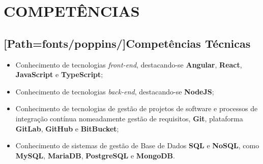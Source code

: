 \section*{\MakeUppercase{Competências}}
\vspace{-1em}
\subsection*{[Path=fonts/poppins/]Competências Técnicas}

\begin{itemize}
	\setlength\itemsep{2pt}
	\item Conhecimento de tecnologias \textit{front-end}, destacando-se \textbf{Angular}, \textbf{React}, \textbf{JavaScript} e \textbf{TypeScript};
	\item Conhecimento de tecnologias \textit{back-end}, destacando-se \textbf{NodeJS};
	\item Conhecimento de tecnologias de gestão de projetos de software e processos de integração contínua nomeadamente gestão de requisitos, \textbf{Git}, plataforma \textbf{GitLab}, \textbf{GitHub} e \textbf{BitBucket};
	\item Conhecimento de sistemas de gestão de Base de Dados \textbf{SQL} e \textbf{NoSQL}, como \textbf{MySQL}, \textbf{MariaDB}, \textbf{PostgreSQL} e \textbf{MongoDB}.
\end{itemize}

\vspace{5pt}

